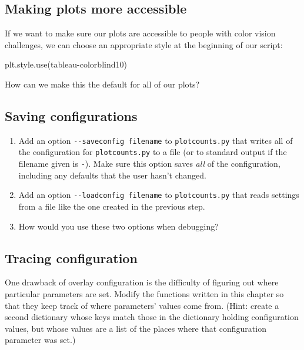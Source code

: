 \documentclass[
]{krantz}
\makeatletter
\newenvironment{Shaded}{\begin{snugshade}}{\end{snugshade}}
\newcommand{\NormalTok}[1]{#1}
\newcommand{\StringTok}[1]{\textcolor[rgb]{0.31,0.60,0.02}{#1}}
\providecommand{\tightlist}{%
  \setlength{\itemsep}{0pt}\setlength{\parskip}{0pt}}
\newenvironment{kframe}{%
\medskip{}
\setlength{\fboxsep}{.8em}
 \def\at@end@of@kframe{}%
 \ifinner\ifhmode%
  \def\at@end@of@kframe{\end{minipage}}%
  \begin{minipage}{\columnwidth}%
 \fi\fi%
 \def\FrameCommand##1{\hskip\@totalleftmargin \hskip-\fboxsep
 \colorbox{shadecolor}{##1}\hskip-\fboxsep
     \hskip-\linewidth \hskip-\@totalleftmargin \hskip\columnwidth}%
 \MakeFramed {\advance\hsize-\width
   \@totalleftmargin\z@ \linewidth\hsize
   \@setminipage}}%
 {\par\unskip\endMakeFramed%
 \at@end@of@kframe}
\renewenvironment{Shaded}{\begin{kframe}}{\end{kframe}}
\makeatother
\begin{document}
\hypertarget{config-ex-accessible}{%
\subsection{Making plots more accessible}\label{config-ex-accessible}}

If we want to make sure our plots are accessible to people with color vision challenges,
we can choose an appropriate style at the beginning of our script:

\begin{Shaded}
\begin{Highlighting}[]
\NormalTok{plt.style.use(}\StringTok{\textquotesingle{}tableau{-}colorblind10\textquotesingle{}}\NormalTok{)}
\end{Highlighting}
\end{Shaded}

How can we make this the default for all of our plots?

\hypertarget{config-ex-saveload}{%
\subsection{Saving configurations}\label{config-ex-saveload}}

\begin{enumerate}
\def\labelenumi{\arabic{enumi}.}
\tightlist
\item
  Add an option \texttt{-\/-saveconfig\ filename} to \texttt{plotcounts.py}
  that writes all of the configuration for \texttt{plotcounts.py} to a file
  (or to standard output if the filename given is \texttt{-}).
  Make sure this option saves \emph{all} of the configuration,
  including any defaults that the user hasn't changed.
\item
  Add an option \texttt{-\/-loadconfig\ filename} to \texttt{plotcounts.py}
  that reads settings from a file like the one created in the previous step.
\item
  How would you use these two options when debugging?
\end{enumerate}

\hypertarget{config-ex-trace}{%
\subsection{Tracing configuration}\label{config-ex-trace}}

One drawback of overlay configuration is
the difficulty of figuring out where particular parameters are set.
Modify the functions written in this chapter
so that they keep track of where parameters' values come from.
(Hint: create a second dictionary whose keys match those in the dictionary holding configuration values,
but whose values are a list of the places where that configuration parameter was set.)
\end{document}
